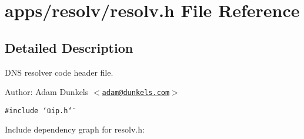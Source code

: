 \hypertarget{a00040}{
\section{apps/resolv/resolv.h File Reference}
\label{a00040}
}


\subsection{Detailed Description}
DNS resolver code header file. 

\begin{Desc}
\item[Author:]Adam Dunkels $<$\href{mailto:adam@dunkels.com}{\tt adam@dunkels.com}$>$ \end{Desc}


{\tt \#include \char`\"{}uip.h\char`\"{}}\par


Include dependency graph for resolv.h:

